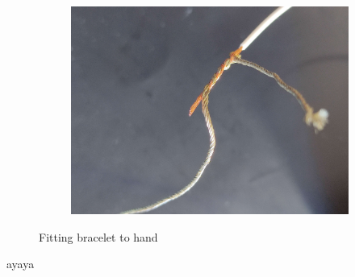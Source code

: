 \documentclass[12pt, a4paper]{article}
\begin{document}
\begin{figure}[h]
\begin{subfigure}[c]{0.33\textwidth}
		\includegraphics[scale=.037]{assets/Connection_thread_wire.jpg}
		\label{fig:Initial_drawing}
	\end{subfigure}
	\caption{Fitting bracelet to hand}
\end{figure}
ayaya
\end{document}
